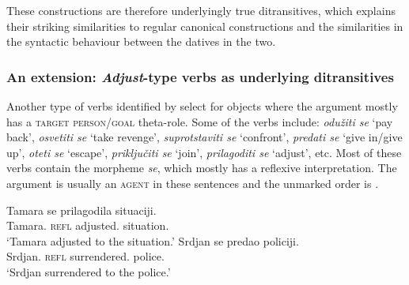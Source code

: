 \documentclass[output=paper,modfonts,newtxmath,hidelinks]{langscibook}
\begin{document}
\noindent These constructions are therefore underlyingly true ditransitives, which explains their striking similarities to regular canonical  constructions and the similarities in the syntactic behaviour between the datives in the two. 

\subsubsection{An extension: \textit{Adjust}-type verbs as underlying ditransitives}

Another type of verbs identified by \citet[300f.]{stipcevic} select for  objects where the  argument mostly has a \textsc{target person/goal} theta-role. Some of the verbs include: \textit{odužiti se} `pay back', \textit{osvetiti se} `take revenge', \textit{suprotstaviti se} `confront', \textit{predati se} `give in/give up', \textit{oteti se} `escape', \textit{priključiti se} `join', \textit{prilagoditi se} `adjust', etc. Most of these verbs contain the morpheme \textit{se}, which mostly has a reflexive interpretation. The  argument is usually an \textsc{agent} in these sentences and the unmarked order is \nomm{} \before{} \datt{} .

\ea\label{16:lexicaladjust}
\ea\label{16:ex29a}\gll Tamara se prilagodila situaciji.\\
Tamara.\nomm{} \textsc{refl} adjusted.\fsg{} situation.\datt\\
\glt `Tamara adjusted to the situation.'
\ex\label{16:ex29b}\gll Srdjan se predao policiji.\\
Srdjan.\nomm{} \textsc{refl} surrendered.\msg{} police.\datt\\
\glt `Srdjan surrendered to the police.'
\z \z
\end{document}
